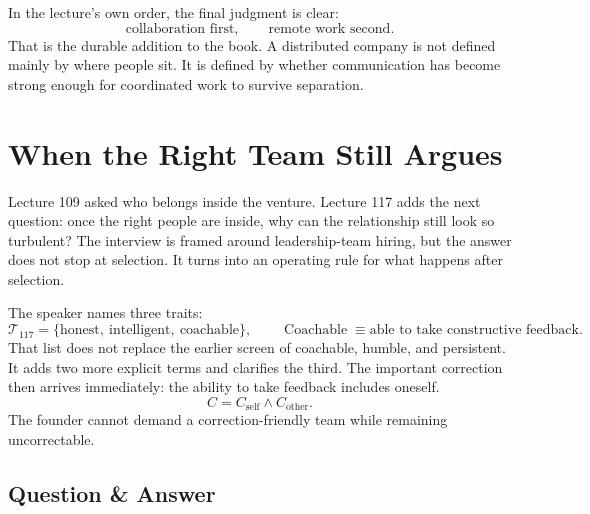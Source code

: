 \documentclass[11pt,oneside]{book}
\begin{document}
In the lecture's own order, the final judgment is clear:
\[
\text{collaboration first},
\qquad
\text{remote work second}.
\]
That is the durable addition to the book. A distributed company is not defined mainly by where people sit. It is defined by whether communication has become strong enough for coordinated work to survive separation.


\section{When the Right Team Still Argues}

Lecture 109 asked who belongs inside the venture. Lecture 117 adds the next question: once the right people are inside, why can the relationship still look so turbulent? The interview is framed around leadership-team hiring, but the answer does not stop at selection. It turns into an operating rule for what happens after selection.

The speaker names three traits:
\[
\mathcal{T}_{117}
=
\{\text{honest},\ \text{intelligent},\ \text{coachable}\},
\qquad
\operatorname{Coachable}
\equiv
\text{able to take constructive feedback}.
\]
That list does not replace the earlier screen of coachable, humble, and persistent. It adds two more explicit terms and clarifies the third. The important correction then arrives immediately: the ability to take feedback includes oneself.
\[
C = C_{\text{self}} \wedge C_{\text{other}}.
\]
The founder cannot demand a correction-friendly team while remaining uncorrectable.

\subsection{Question \& Answer}
\end{document}

